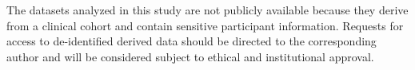The datasets analyzed in this study are not publicly available because they derive from a clinical cohort and contain sensitive participant information. Requests for access to de-identified derived data should be directed to the corresponding author and will be considered subject to ethical and institutional approval.
